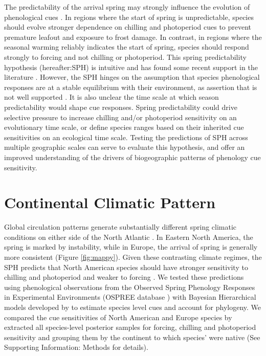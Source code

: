 \documentclass[12pt]{article}
\begin{document}
The predictability of the arrival spring may strongly influence the evolution of phenological cues \citep{Zohner:2017aa,Zohner:2017ua,Dawson2025}. In regions where the start of spring is unpredictable, species should evolve stronger dependence on chilling and photoperiod cues to prevent premature leafout and exposure to frost damage. In contrast, in regions where the seasonal warming reliably indicates the start of spring, species should respond strongly to forcing and not chilling or photoperiod. This spring predictability hypothesis (hereafter:SPH) is intuitive and has found some recent support in the literature \citep{Zohner:2017aa}. However, the SPH hinges on the assumption that species phenological responses are at a stable equilibrium with their environment, as assertion that is not well supported \citep{Normand2011,Lechowicz1984}. It is also unclear the time scale at which season predictability would shape cue responses. Spring predictability could drive selective pressure to increase chilling and/or photoperiod sensitivity on an evolutionary time scale, or define species ranges based on their inherited cue sensitivities on an ecological time scale. Testing the predictions of SPH across multiple geographic scales can serve to evaluate this hypothesis, and offer an improved understanding of the drivers of biogeographic patterns of phenology cue sensitivity.

\section*{Continental Climatic Pattern}

Global circulation patterns generate substantially different spring climatic conditions on either side of the North Atlantic \citep{}. In Eastern North America, the spring is marked by instability, while in Europe, the arrival of spring is generally more consistent (Figure \ref{fig:mappy}). Given these contrasting climate regimes, the SPH predicts that North American species should have stronger sensitivity to chilling and photoperiod and weaker to forcing \citep{Dawson2025}. We tested these predictions using phenological observations from the Observed Spring Phenology Responses in Experimental Environments  (OSPREE database \citep{wolkovich2019}) with Bayesian Hierarchical models developed by \citet{Morales-Castilla:2024vp} to estimate species level cues and account for phylogeny. We compared the cue sensitivities of North American and Europe species by extracted all species-level posterior samples for forcing, chilling and photoperiod sensitivity and grouping them by the continent to which species' were native (See Supporting Information: Methods for details).
\end{document}
